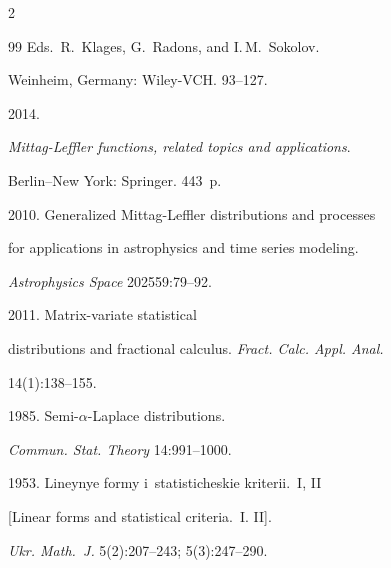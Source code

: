 \begin{multicols}{2}
{{\begin{thebibliography}{99}
Eds.\ R.~Klages, G.~Radons, and I.\,M.~Sokolov. 


 Weinheim, Germany: Wiley-VCH. 93--127.







 2014.


\textit{Mittag-Leffler functions, related topics and applications}. 


Berlin--New York: Springer.  443~p.















2010. Generalized Mittag-Leffler distributions and processes 


for applications in astrophysics and time series modeling. 


\textit{Astrophysics Space} 202559:79--92.







 2011. Matrix-variate statistical 


distributions and fractional calculus. \textit{Fract. Calc. Appl. Anal.} 


14(1):138--155.







 1985. Semi-$\alpha$-Laplace distributions.


\textit{Commun. Stat. Theory} 14:991--1000.









1953. Lineynye formy i~statisticheskie kriterii.~I, II 


[Linear forms and statistical criteria.~I. II]. 


\textit{Ukr. Math.~J.} 5(2):207--243; 5(3):247--290.









\end{thebibliography}}}
\end{multicols}
